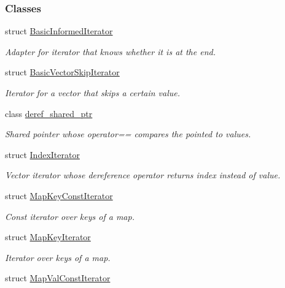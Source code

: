 \subsubsection*{Classes}
\begin{DoxyCompactItemize}
\item 
struct \hyperlink{structslb_1_1core_1_1util_1_1BasicInformedIterator}{Basic\+Informed\+Iterator}
\begin{DoxyCompactList}\small\item\em Adapter for iterator that knows whether it is at the end. \end{DoxyCompactList}\item 
struct \hyperlink{structslb_1_1core_1_1util_1_1BasicVectorSkipIterator}{Basic\+Vector\+Skip\+Iterator}
\begin{DoxyCompactList}\small\item\em Iterator for a vector that skips a certain value. \end{DoxyCompactList}\item 
class \hyperlink{classslb_1_1core_1_1util_1_1deref__shared__ptr}{deref\+\_\+shared\+\_\+ptr}
\begin{DoxyCompactList}\small\item\em Shared pointer whose {\ttfamily operator==} compares the pointed to values. \end{DoxyCompactList}\item 
struct \hyperlink{structslb_1_1core_1_1util_1_1IndexIterator}{Index\+Iterator}
\begin{DoxyCompactList}\small\item\em Vector iterator whose dereference operator returns index instead of value. \end{DoxyCompactList}\item 
struct \hyperlink{structslb_1_1core_1_1util_1_1MapKeyConstIterator}{Map\+Key\+Const\+Iterator}
\begin{DoxyCompactList}\small\item\em Const iterator over keys of a map. \end{DoxyCompactList}\item 
struct \hyperlink{structslb_1_1core_1_1util_1_1MapKeyIterator}{Map\+Key\+Iterator}
\begin{DoxyCompactList}\small\item\em Iterator over keys of a map. \end{DoxyCompactList}\item 
struct \hyperlink{structslb_1_1core_1_1util_1_1MapValConstIterator}{Map\+Val\+Const\+Iterator}

\end{DoxyCompactItemize}
